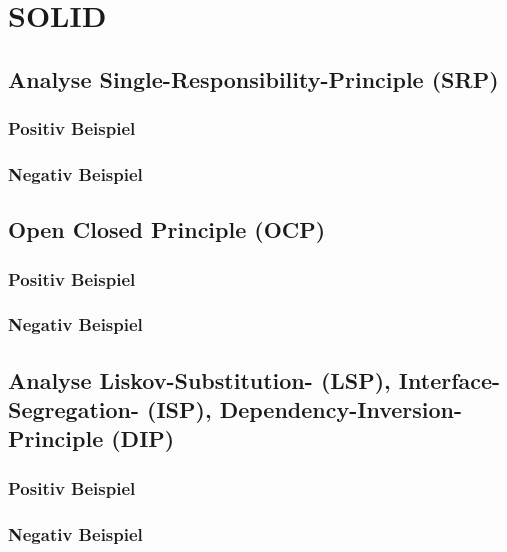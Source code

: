 \chapter{SOLID}
\section{Analyse Single-Responsibility-Principle (SRP)}
\subsection{Positiv Beispiel}
\subsection{Negativ Beispiel}
\section{Open Closed Principle (OCP)}
\subsection{Positiv Beispiel}
\subsection{Negativ Beispiel}
\section{Analyse Liskov-Substitution- (LSP), Interface-Segregation- (ISP), Dependency-Inversion-Principle (DIP)}
\subsection{Positiv Beispiel}
\subsection{Negativ Beispiel}